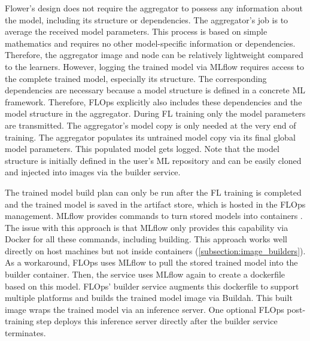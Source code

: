 Flower's design does not require the aggregator to possess any information about the model, including its structure or dependencies.
The aggregator's job is to average the received model parameters.
This process is based on simple mathematics and requires no other model-specific information or dependencies.
Therefore, the aggregator image and node can be relatively lightweight compared to the learners.
However, logging the trained model via MLflow requires access to the complete trained model, especially its structure.
The corresponding dependencies are necessary because a model structure is defined in a concrete ML framework.
Therefore, FLOps explicitly also includes these dependencies and the model structure in the aggregator.
During FL training only the model parameters are transmitted.
The aggregator's model copy is only needed at the very end of training.
The aggregator populates its untrained model copy via its final global model parameters.
This populated model gets logged.
Note that the model structure is initially defined in the user's ML repository and can be easily cloned and injected into images via the builder service.

The trained model build plan can only be run after the FL training is completed and the trained model is saved in the artifact store, which is hosted in the FLOps management.
MLflow provides commands to turn stored models into containers \cite{docs:mlfow_docker_cmds}.
The issue with this approach is that MLflow only provides this capability via Docker for all these commands, including building.
This approach works well directly on host machines but not inside containers (\ref{subsection:image_builders}).
As a workaround, FLOps uses MLflow to pull the stored trained model into the builder container.
Then, the service uses MLflow again to create a dockerfile based on this model.
FLOps' builder service augments this dockerfile to support multiple platforms and builds the trained model image via Buildah.
This built image wraps the trained model via an inference server.
One optional FLOps post-training step deploys this inference server directly after the builder service terminates.

